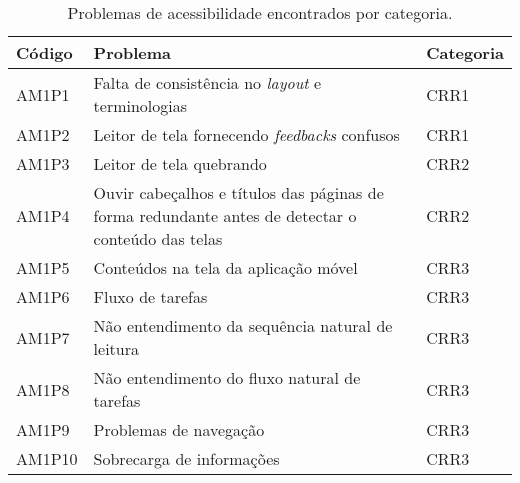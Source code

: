 \begin{table}[htb]
  \begin{center}
    \ABNTEXfontereduzida
    \caption{Problemas de acessibilidade encontrados por categoria.}
    \label{tab-pro-enc-ar5}
    \begin{tabular}{p{1.2cm}|p{11.5cm}|p{1.5cm}}
      \textbf{Código} & \textbf{Problema}                                                                                 & \textbf{Categoria} \\
      \hline
      AM1P1           & Falta de consistência no \emph{layout} e terminologias                                            & CRR1               \\
      \hline
      AM1P2           & Leitor de tela fornecendo \emph{feedbacks} confusos                                               & CRR1               \\
      \hline
      AM1P3           & Leitor de tela quebrando                                                                          & CRR2               \\
      \hline
      AM1P4           & Ouvir cabeçalhos e títulos das páginas de forma redundante antes de detectar o conteúdo das telas & CRR2               \\
      \hline
      AM1P5           & Conteúdos na tela da aplicação móvel                                                              & CRR3               \\
      \hline
      AM1P6           & Fluxo de tarefas                                                                                  & CRR3               \\
      \hline
      AM1P7           & Não entendimento da sequência natural de leitura                                                  & CRR3               \\
      \hline
      AM1P8           & Não entendimento do fluxo natural de tarefas                                                      & CRR3               \\
      \hline
      AM1P9           & Problemas de navegação                                                                            & CRR3               \\
      \hline
      AM1P10          & Sobrecarga de informações                                                                         & CRR3               \\
    \end{tabular}
  \end{center}
\end{table}

